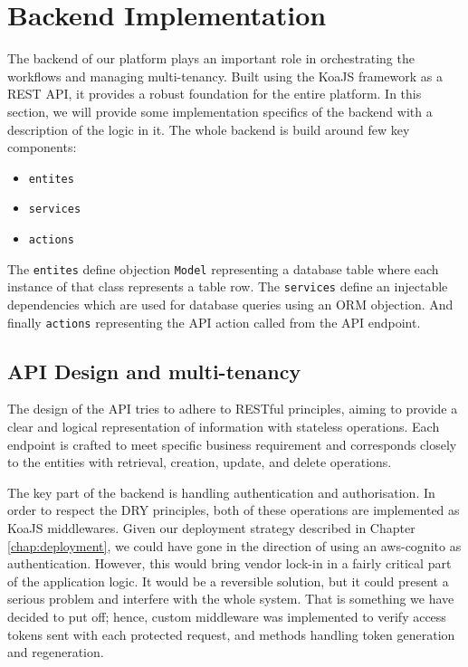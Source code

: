 \section{Backend Implementation}
\label{sec:backend-implementation}
The backend of our platform plays an important role in orchestrating the workflows and managing multi-tenancy.
Built using the KoaJS framework as a REST API, it provides a robust foundation for the entire platform.
In this section, we will provide some implementation specifics of the backend with a description of the logic in it.
The whole backend is build around few key components:
\begin{itemize}
    \item \texttt{entites}
    \item \texttt{services}
    \item \texttt{actions}
\end{itemize}

The \texttt{entites} define \gls{objection} \texttt{Model} representing a database table where each instance of that class represents a table row.
The \texttt{services} define an injectable dependencies which are used for database queries using an \ac{ORM} \gls{objection}.
And finally \texttt{actions} representing the API action called from the API endpoint.

\subsection{API Design and multi-tenancy}
\label{subsec:api-design-endpoints}

The design of the API tries to adhere to RESTful principles, aiming to provide a clear and logical representation of information with stateless operations.
Each endpoint is crafted to meet specific business requirement and corresponds closely to the entities with retrieval, creation, update, and delete operations.

The key part of the backend is handling authentication and authorisation. 
In order to respect the \ac{DRY} principles, both of these operations are implemented as KoaJS middlewares.
Given our deployment strategy described in Chapter \ref{chap:deployment}, we could have gone in the direction of using an \gls{aws-cognito} as authentication.
However, this would bring vendor lock-in in a fairly critical part of the application logic.
It would be a reversible solution, but it could present a serious problem and interfere with the whole system.
That is something we have decided to put off; hence, custom middleware was implemented to verify access tokens sent with each protected request, and methods handling token generation and regeneration.

